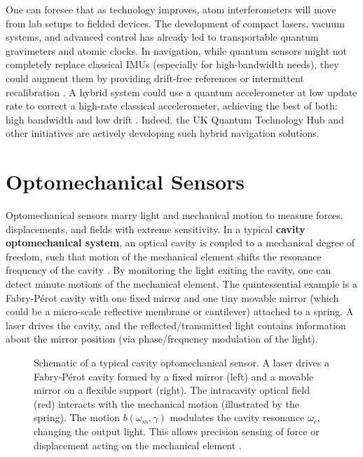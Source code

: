 One can foresee that as technology improves, atom interferometers will
move from lab setups to fielded devices. The development of compact
lasers, vacuum systems, and advanced control has already led to
transportable quantum gravimeters and atomic clocks. In navigation,
while quantum sensors might not completely replace classical IMUs
(especially for high-bandwidth needs), they could augment them by
providing drift-free references or intermittent recalibration . A
hybrid system could use a quantum accelerometer at low update rate to
correct a high-rate classical accelerometer, achieving the best of
both: high bandwidth and low drift . Indeed, the UK Quantum Technology
Hub and other initiatives are actively developing such hybrid
navigation solutions.



\section{Optomechanical Sensors}\label{sec:optomech}

Optomechanical sensors marry light and mechanical motion to measure
forces, displacements, and fields with extreme sensitivity. In a
typical \textbf{cavity optomechanical system}, an optical cavity is
coupled to a mechanical degree of freedom, such that motion of the
mechanical element shifts the resonance frequency of the cavity . By
monitoring the light exiting the cavity, one can detect minute motions
of the mechanical element. The quintessential example is a Fabry-Pérot
cavity with one fixed mirror and one tiny movable mirror (which could
be a micro-scale reflective membrane or cantilever) attached to a
spring. A laser drives the cavity, and the reflected/transmitted light
contains information about the mirror position (via phase/frequency
modulation of the light).



\begin{figure}[h]

\centering

\caption{Schematic of a typical cavity optomechanical sensor. A laser drives a Fabry-Pérot cavity formed by a fixed mirror (left) and a movable mirror on a flexible support (right). The intracavity optical field (red) interacts with the mechanical motion (illustrated by the spring). The motion $b(\omega_m,\gamma)$ modulates the cavity resonance $\omega_c$, changing the output light. This allows precision sensing of force or displacement acting on the mechanical element .}

\label{fig:optomech}

\end{figure}



